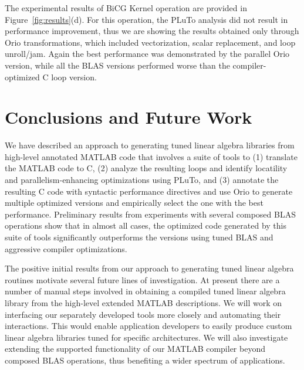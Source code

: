 \documentclass[runningheads]{llncs}
\begin{document}
The experimental results of BiCG Kernel operation are provided in
Figure~\ref{fig:results}(d). For this operation, the PLuTo analysis
did not result in performance improvement, thus we are showing the
results obtained only through Orio transformations, which included
vectorization, scalar replacement, and loop unroll/jam. Again the best
performance was demonstrated by the parallel Orio version, while all
the BLAS versions performed worse than the compiler-optimized C loop
version.

\section{Conclusions and Future Work}

We have described an approach to generating tuned linear algebra libraries from high-level annotated MATLAB code that involves a suite of tools to (1) translate the MATLAB code to C, (2) analyze the resulting loops and identify locatility and parallelism-enhancing optimizations using PLuTo, and (3) annotate the resulting C code with syntactic performance directives and use Orio to generate multiple optimized versions and empirically select the one with the best performance. Preliminary results from experiments with several composed BLAS operations show that in almost all cases, the optimized code generated by this suite of tools significantly outperforms the versions using tuned BLAS and aggressive compiler optimizations.

The positive initial results from our approach to generating tuned linear algebra routines motivate several future lines of investigation. At present there are a number of manual steps involved in obtaining a compiled tuned linear algebra library from the high-level extended MATLAB descriptions. We will work on interfacing our separately developed tools more closely and automating their interactions. This would enable application developers to easily produce custom linear algebra libraries tuned for specific architectures. We will also investigate extending the supported functionality of our MATLAB compiler beyond composed BLAS operations, thus benefiting a wider spectrum of applications.
\end{document}
